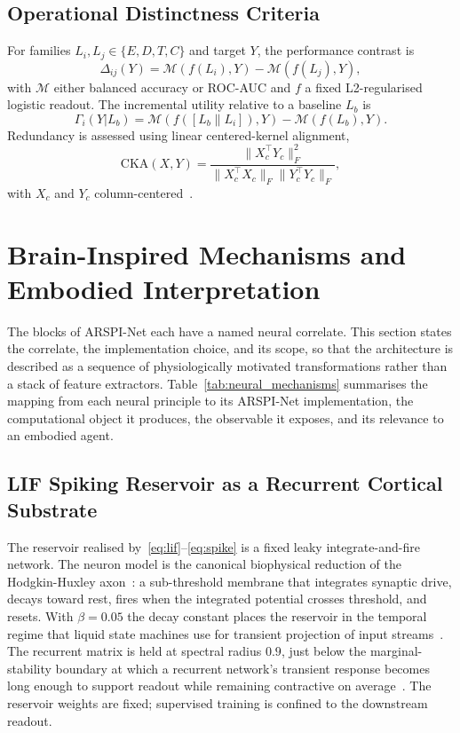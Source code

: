 \documentclass[journal]{IEEEtran}
\begin{document}
\subsection{Operational Distinctness Criteria}
For families $L_i,L_j\in\{E,D,T,C\}$ and target $Y$, the performance contrast is
\begin{equation}
\Delta_{ij}(Y)=\mathcal{M}(f(L_i),Y)-\mathcal{M}(f(L_j),Y),
\label{eq:contrast}
\end{equation}
with $\mathcal{M}$ either balanced accuracy or ROC-AUC and $f$ a fixed L2-regularised logistic readout. The incremental utility relative to a baseline $L_b$ is
\begin{equation}
\Gamma_i(Y|L_b)=\mathcal{M}(f([L_b\|L_i]),Y)-\mathcal{M}(f(L_b),Y).
\label{eq:increment}
\end{equation}
Redundancy is assessed using linear centered-kernel alignment,
\begin{equation}
\mathrm{CKA}(X,Y)=\frac{\|X_c^{\top}Y_c\|_F^2}{\|X_c^{\top}X_c\|_F\|Y_c^{\top}Y_c\|_F},
\label{eq:cka}
\end{equation}
with $X_c$ and $Y_c$ column-centered~\cite{kornblith2019similarity}.

\section{Brain-Inspired Mechanisms and Embodied Interpretation}\label{sec:mechanisms}

The blocks of ARSPI-Net each have a named neural correlate. This section states the correlate, the implementation choice, and its scope, so that the architecture is described as a sequence of physiologically motivated transformations rather than a stack of feature extractors. Table~\ref{tab:neural_mechanisms} summarises the mapping from each neural principle to its ARSPI-Net implementation, the computational object it produces, the observable it exposes, and its relevance to an embodied agent.



\subsection{LIF Spiking Reservoir as a Recurrent Cortical Substrate}
The reservoir realised by~\eqref{eq:lif}--\eqref{eq:spike} is a fixed leaky integrate-and-fire network. The neuron model is the canonical biophysical reduction of the Hodgkin-Huxley axon~\cite{hodgkin1952quantitative}: a sub-threshold membrane that integrates synaptic drive, decays toward rest, fires when the integrated potential crosses threshold, and resets. With $\beta=0.05$ the decay constant places the reservoir in the temporal regime that liquid state machines use for transient projection of input streams~\cite{maass2002liquid}. The recurrent matrix is held at spectral radius $0.9$, just below the marginal-stability boundary at which a recurrent network's transient response becomes long enough to support readout while remaining contractive on average~\cite{jaeger2001echo,sussillo2009generating}. The reservoir weights are fixed; supervised training is confined to the downstream readout.
\end{document}
